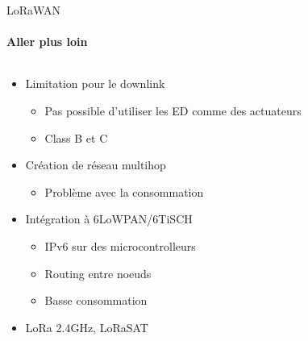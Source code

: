 \begin{frame}{LoRaWAN}
\framesubtitle{Aller plus loin}
\begin{columns}
  \begin{column}{0.5\textwidth}
    
\begin{itemize}
  \item Limitation pour le downlink
  \begin{itemize}
    \item Pas possible d'utiliser les ED comme des actuateurs
    \item Class B et C
  \end{itemize}
  \item Création de réseau multihop
  \begin{itemize}
    \item Problème avec la consommation
  \end{itemize}
  \item Intégration à 6LoWPAN/6TiSCH
  \begin{itemize}
    \item IPv6 sur des microcontrolleurs
    \item Routing entre noeuds
    \item Basse consommation
  \end{itemize}
  \item LoRa 2.4GHz, LoRaSAT
\end{itemize}
\end{column}
\begin{column}{0.5\textwidth}
\begin{center}
\end{center}
\end{column}
\end{columns}
\end{frame}

